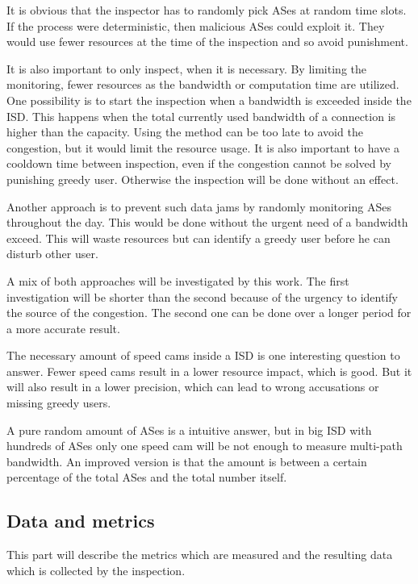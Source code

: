 \documentclass[thesis.tex]{subfiles}
\begin{document}
It is obvious that the inspector has to randomly pick ASes at random time slots. If the process were deterministic, then malicious ASes could exploit it. They would use fewer resources at the time of the inspection and so avoid punishment.

It is also important to only inspect, when it is necessary. By limiting the monitoring, fewer resources as the bandwidth or computation time are utilized. One possibility is to start the inspection when a bandwidth is exceeded inside the ISD. This happens when the total currently used bandwidth of a connection is higher than the capacity. Using the method can be too late to avoid the congestion, but it would limit the resource usage. 
It is also important to have a cooldown time between inspection, even if the congestion cannot be solved by punishing greedy user. Otherwise the inspection will be done without an effect.


Another approach is to prevent such data jams by randomly monitoring ASes throughout the day. This would be done without the urgent need of a bandwidth exceed. This will waste resources but can identify a greedy user before he can disturb other user. 

A mix of both approaches will be investigated by this work. The first investigation will be shorter than the second because of the urgency to identify the source of the congestion. The second one can be done over a longer period for a more accurate result.


The necessary amount of speed cams inside a ISD is one interesting question to answer. Fewer speed cams result in a lower resource impact, which is good. But it will also result in a lower precision, which can lead to wrong accusations or missing greedy users.

A pure random amount of ASes is a intuitive answer, but in big ISD with hundreds of ASes only one speed cam will be not enough to measure multi-path bandwidth. An improved version is that the amount is between a certain percentage of the total ASes and the total number itself.




\subsection{Data and metrics}
This part will describe the metrics which are measured and the resulting data which is collected by the inspection.
\end{document}
